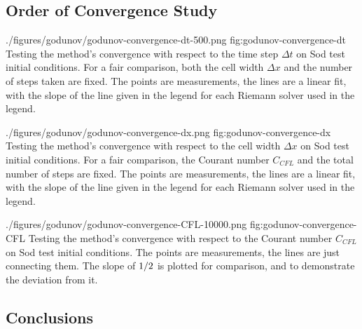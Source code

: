 \subsection{Order of Convergence Study}



\quickfigcap
	{./figures/godunov/godunov-convergence-dt-500.png}
	{fig:godunov-convergence-dt}
	{
		Testing the method's convergence with respect to the time step $\Delta t$ on Sod test initial conditions.
		For a fair comparison, both the cell width $\Delta x$ and the number of steps taken are fixed.
		The points are measurements, the lines are a linear fit, with the slope of the line given in the legend for each Riemann solver used in the legend.
	}


\quickfigcap
	{./figures/godunov/godunov-convergence-dx.png}
	{fig:godunov-convergence-dx}
	{
		Testing the method's convergence with respect to the cell width $\Delta x$ on Sod test initial conditions.
		For a fair comparison, the Courant number $C_{CFL}$ and the total number of steps are fixed.
		The points are measurements, the lines are a linear fit, with the slope of the line given in the legend for each Riemann solver used in the legend.
	}
	
\quickfigcap
	{./figures/godunov/godunov-convergence-CFL-10000.png}
	{fig:godunov-convergence-CFL}
	{
		Testing the method's convergence with respect to the Courant number $C_{CFL}$ on Sod test initial conditions.
		The points are measurements, the lines are just connecting them.
		The slope of $1/2$ is plotted for comparison, and to demonstrate the deviation from it.
	}























\subsection{Conclusions}


